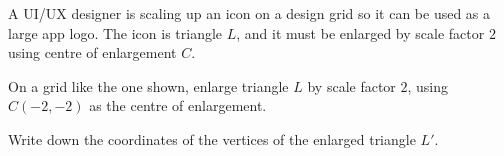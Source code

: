 \begin{question}
\noindent A UI/UX designer is scaling up an icon on a design grid so it can be used as a large app logo. The icon is triangle $L$, and it must be enlarged by scale factor $2$ using centre of enlargement $C$.

\begin{center}
\end{center}

\noindent On a grid like the one shown, enlarge triangle $L$ by scale factor $2$, using $C(-2,-2)$ as the centre of enlargement.

Write down the coordinates of the vertices of the enlarged triangle $L'$.

\vspace{5cm}
\end{question}